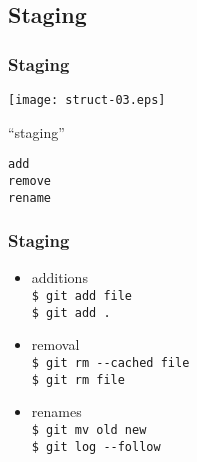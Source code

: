 \documentclass[english]{beamer}
\newcommand{\mysubsection}[2]{%
  \hypertarget{#2}{}%
  \subsection{#1}%
  \label{#2}%
}
\newcommand{\CMD}[1]{%
\texttt{\textcolor{code-blue}{#1}}%
}
\begin{document}
\mysubsection{Staging}{using:staging}
\begin{frame}
\frametitle{Staging}

\texttt{[image: struct-03.eps]}
\vspace{\baselineskip}
\begin{center}
        ``staging''

        \vspace{\baselineskip}
        \CMD{add} \\
        \CMD{remove} \\
        \CMD{rename}
\end{center}
\vspace{\textheight}
\end{frame}

\begin{frame}
\frametitle{Staging}

\vspace{.1\textheight}

\begin{itemize}
        \item additions \\
                \CMD{\$ git add file} \\
                \CMD{\$ git add .} \\
                \vspace{.1\textheight}
        \item removal \\
                \CMD{\$ git rm -{}-cached file} \\
                \CMD{\$ git rm file}
                \vspace{.1\textheight}
        \item renames \\
                \CMD{\$ git mv old new} \\
                \CMD{\$ git log -{}-follow}
\end{itemize}
\end{frame}
\end{document}
